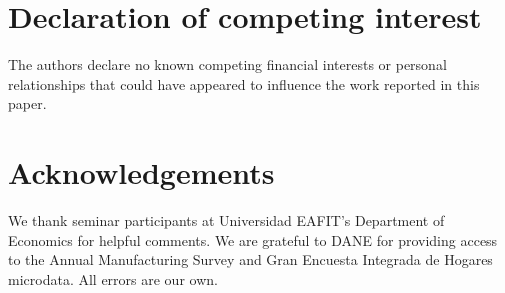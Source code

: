 \documentclass[a4paper,fleqn]{cas-sc}
\begin{document}
\section*{Declaration of competing interest}

The authors declare no known competing financial interests or personal relationships that could have appeared to influence the work reported in this paper.

\section*{Acknowledgements}

We thank seminar participants at Universidad EAFIT's Department of Economics for helpful comments. We are grateful to DANE for providing access to the Annual Manufacturing Survey and Gran Encuesta Integrada de Hogares microdata. All errors are our own.



\end{document}
